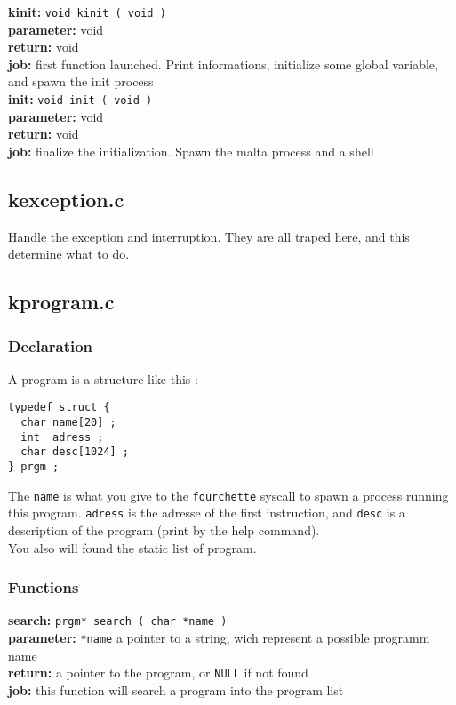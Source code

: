 \noindent\textbf{kinit:} \verb+void kinit ( void )+\\
\textbf{parameter:} void\\
\textbf{return:} void\\
\textbf{job:} first function launched. Print informations, initialize some global variable, and spawn the init process\\

\noindent\textbf{init:} \verb+void init ( void )+\\
\textbf{parameter:} void\\
\textbf{return:} void\\
\textbf{job:} finalize the initialization. Spawn the malta process and a shell\\

\subsection{kexception.c}

Handle the exception and interruption. They are all traped here, and this determine what to do.

\subsection{kprogram.c}

\subsubsection{Declaration}

A program is a structure like this :
\begin{verbatim}
typedef struct {
  char name[20] ;
  int  adress ;
  char desc[1024] ;
} prgm ;
\end{verbatim}

The \verb+name+ is what you give to the \verb+fourchette+ syscall to spawn a process running this program. \verb+adress+ is the adresse of the first instruction, and \verb+desc+ is a description of the program (print by the help command).\\

You also will found the static list of program.

\subsubsection{Functions}

\noindent\textbf{search:} \verb+prgm* search ( char *name )+\\
\textbf{parameter:} \verb+*name+ a pointer to a string, wich represent a possible programm name\\
\textbf{return:} a pointer to the program, or \verb+NULL+ if not found\\
\textbf{job:} this function will search a program into the program list\\

